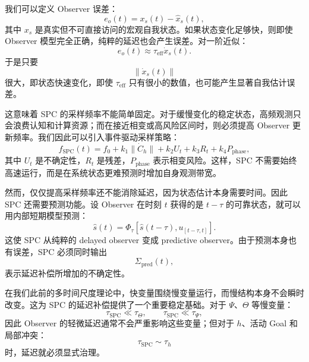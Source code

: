 我们可以定义 Observer 误差：
\begin{equation}
e_o(t)
=
x_s(t)-\hat x_s(t),
\end{equation}
其中 $x_s$ 是真实但不可直接访问的宏观自我状态。如果状态变化足够快，则即使 Observer 模型完全正确，纯粹的延迟也会产生误差。对一阶近似：
\begin{equation}
e_o(t)
\approx
\tau_{\mathrm{eff}}
\dot x_s(t).
\end{equation}
于是只要
\begin{equation}
\|\dot x_s(t)\|
\end{equation}
很大，即状态快速变化，即使 $\tau_{\mathrm{eff}}$ 只有很小的数值，也可能产生显著自我估计误差。

这意味着 SPC 的采样频率不能简单固定。对于缓慢变化的稳定状态，高频观测只会浪费认知和计算资源；而在接近相变或高风险区间时，则必须提高 Observer 更新频率。我们因此可以引入事件驱动采样策略：
\begin{equation}
f_{\mathrm{SPC}}(t)
=
f_0
+
k_1\|\dot C_h\|
+
k_2 U_t
+
k_3 R_t
+
k_4 P_{\mathrm{phase}},
\end{equation}
其中 $U_t$ 是不确定性，$R_t$ 是残差，$P_{\mathrm{phase}}$ 表示相变风险。这样，SPC 不需要始终高速运行，而是在系统状态更难预测时增加自身观测带宽。

然而，仅仅提高采样频率还不能消除延迟，因为状态估计本身需要时间。因此 SPC 还需要预测功能。设 Observer 在时刻 $t$ 获得的是 $t-\tau$ 的可靠状态，就可以用内部短期模型预测：
\begin{equation}
\hat s(t)
=
\Phi_\tau
\left[
\hat s(t-\tau),
u_{[t-\tau,t]}
\right].
\end{equation}
这使 SPC 从纯粹的 delayed observer 变成 predictive observer。由于预测本身也有误差，SPC 必须同时输出
\begin{equation}
\Sigma_{\mathrm{pred}}(t),
\end{equation}
表示延迟补偿所增加的不确定性。

在我们此前的多时间尺度理论中，快变量围绕慢变量运行，而慢结构本身不会瞬时改变。这为 SPC 的延迟补偿提供了一个重要稳定基础。对于 $\Psi$、$\Theta$ 等慢变量：
\begin{equation}
\tau_{\mathrm{SPC}}
\ll
\tau_\Theta,
\qquad
\tau_{\mathrm{SPC}}
\ll
\tau_\Psi,
\end{equation}
因此 Observer 的轻微延迟通常不会严重影响这些变量；但对于 $h$、活动 Goal 和局部冲突：
\begin{equation}
\tau_{\mathrm{SPC}}
\sim
\tau_h
\end{equation}
时，延迟就必须显式治理。

